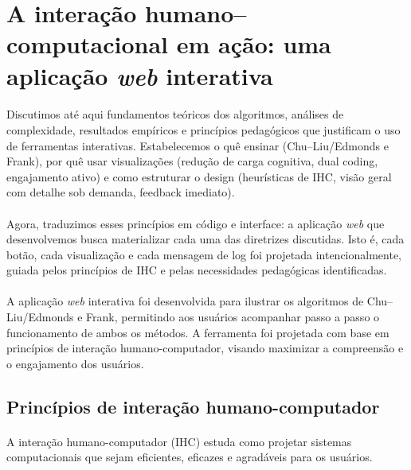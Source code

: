 \documentclass[12pt,a4paper]{article}
\def\emph#1{#1}%
\begin{document}
\section{A interação humano--computacional em ação: uma aplicação \textit{web} interativa}

\paragraph{}
Discutimos até aqui fundamentos teóricos dos algoritmos, análises de complexidade, resultados empíricos e princípios pedagógicos que justificam o uso de ferramentas interativas. Estabelecemos \emph{o quê} ensinar (Chu–Liu/Edmonds e Frank), \emph{por quê} usar visualizações (redução de carga cognitiva, dual coding, engajamento ativo) e \emph{como} estruturar o design (heurísticas de IHC, visão geral com detalhe sob demanda, feedback imediato).

\paragraph{}
Agora, traduzimos esses princípios em código e interface: a aplicação \textit{web} que desenvolvemos busca materializar cada uma das diretrizes discutidas. Isto é, cada botão, cada visualização e cada mensagem de log foi projetada intencionalmente, guiada pelos princípios de IHC e pelas necessidades pedagógicas identificadas.

\paragraph{}
A aplicação \textit{web} interativa foi desenvolvida para ilustrar os algoritmos de Chu–Liu/Edmonds e Frank, permitindo aos usuários acompanhar passo a passo o funcionamento de ambos os métodos. A ferramenta foi projetada com base em princípios de interação humano-computador, visando maximizar a compreensão e o engajamento dos usuários.

\subsection{Princípios de interação humano-computador}

\paragraph{}
A interação humano-computador (IHC) estuda como projetar sistemas computacionais que sejam eficientes, eficazes e agradáveis para os usuários.
\end{document}
